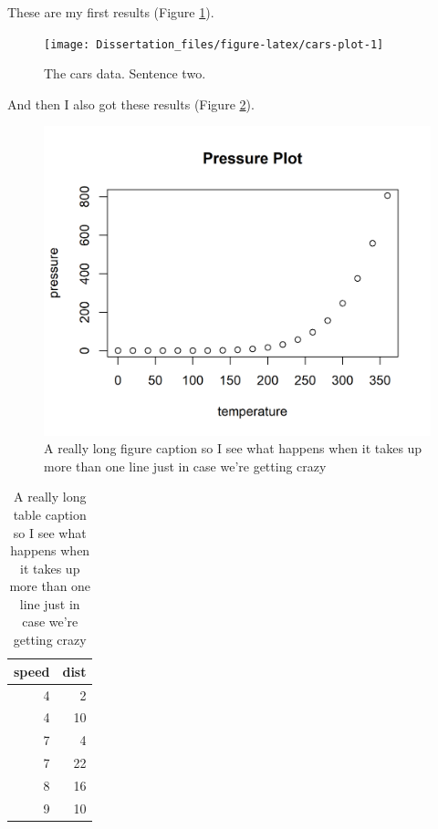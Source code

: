 \documentclass[
  10pt,
]{report}
\begin{document}
These are my first results (Figure \ref{fig:cars-plot}).

\begin{figure}
\texttt{[image: Dissertation\_files/figure-latex/cars-plot-1]} \caption[The cars data.]{The cars data. Sentence two.}\label{fig:cars-plot}
\end{figure}

And then I also got these results (Figure \ref{fig:test-fig}).

\begin{figure}
\includegraphics[width=20.83in]{Figures/pressure_plot} \caption{A really long figure caption so I see what happens when it takes up more than one line just in case we're getting crazy}\label{fig:test-fig}
\end{figure}

\begin{table}

\caption{\label{tab:testtable-2}A really long table caption so I see what happens when it takes up more than one line just in case we're getting crazy}
\centering
\begin{tabular}[t]{r|r}
\hline
speed & dist\\
\hline
4 & 2\\
\hline
4 & 10\\
\hline
7 & 4\\
\hline
7 & 22\\
\hline
8 & 16\\
\hline
9 & 10\\
\hline
\end{tabular}
\end{table}
\end{document}
